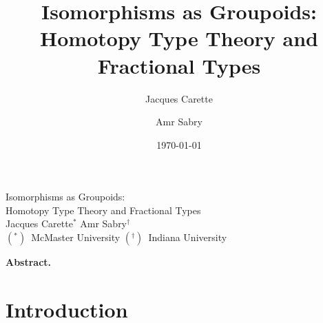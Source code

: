 \documentclass[11pt]{article}
\begin{document}
\begin{titlepage}
\begin{center}
\vfill
{\LARGE Isomorphisms as Groupoids: \\ 
  Homotopy Type Theory and Fractional Types} \\[1.5cm]
{\Large Jacques Carette${}^*$ \qquad Amr Sabry${}^{\dagger}$}\\[0.5cm]
{\Large $({}^*)$~McMaster University \qquad $({}^\dagger)$~Indiana University}
\vfill
\end{center}
\vfill
\noindent\textbf{Abstract.} 

\vfill
\vfill
\end{titlepage}

\title{Isomorphisms as Groupoids: \\ 
  Homotopy Type Theory and Fractional Types}
\author{Jacques Carette \and Amr Sabry}
\date{\today}
\maketitle

\section{Introduction}
\end{document}

